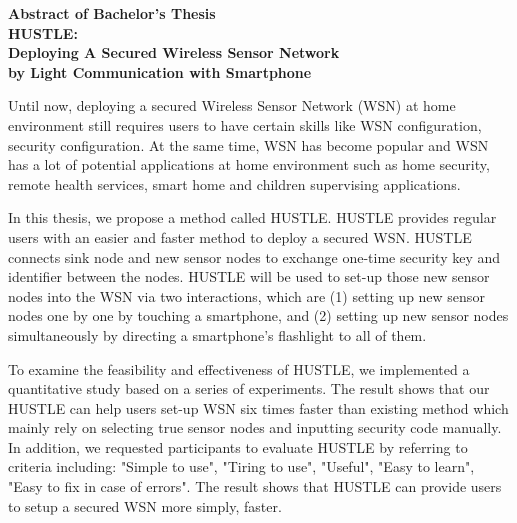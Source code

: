 \begin{center}

\begin{Large}
{\bf Abstract of Bachelor's Thesis} \\

\vspace{5mm}
{\bf HUSTLE:\\Deploying A Secured Wireless Sensor Network\\
by Light Communication with Smartphone}
\end{Large}
\end{center}

\vspace{0.4cm}

Until now, deploying a secured Wireless Sensor Network (WSN) at home environment still requires users to have certain skills like WSN configuration, security configuration. At the same time, WSN has become popular and WSN has a lot of potential applications at home environment such as home security, remote health services, smart home and children supervising applications.


In this thesis, we propose a method called HUSTLE. HUSTLE provides regular users with an easier and faster method to deploy a secured WSN. HUSTLE connects sink node and new sensor nodes to exchange one-time security key and identifier between the nodes. HUSTLE will be used to set-up those new sensor nodes into the WSN via two interactions, which are (1) setting up new sensor nodes one by one by touching a smartphone, and (2) setting up new sensor nodes simultaneously by directing a smartphone's flashlight to all of them.

To examine the feasibility and effectiveness of HUSTLE, we implemented a quantitative study based on a series of experiments. The result shows that our HUSTLE can help users set-up WSN six times faster than existing method which mainly rely on selecting true sensor nodes and inputting security code manually. In addition, we requested participants to evaluate HUSTLE by referring to criteria including: "Simple to use", "Tiring to use", "Useful", "Easy to learn", "Easy to fix in case of errors". The result shows that HUSTLE can provide users to setup a secured WSN more simply, faster.
\vspace{-2.5mm}

